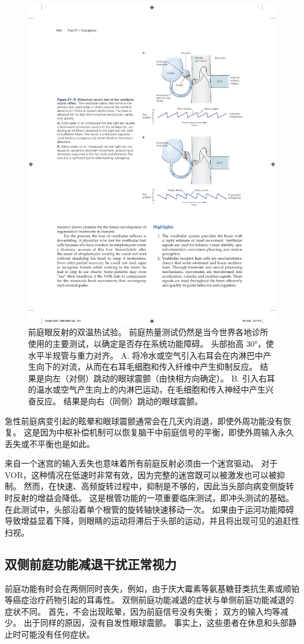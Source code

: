 \begin{figure}[htbp]
	\centering
	\includegraphics[width=0.6\linewidth]{chap27/fig_27_15}
	\caption{前庭眼反射的双温热试验。 前庭热量测试仍然是当今世界各地诊所使用的主要测试，以确定是否存在系统功能障碍。 头部抬高 30°，使水平半规管与重力对齐。 A. 将冷水或空气引入右耳会在内淋巴中产生向下的对流，从而在右耳毛细胞和传入纤维中产生抑制反应。 结果是向左（对侧）跳动的眼球震颤（由快相方向确定）。 B. 引入右耳的温水或空气产生向上的内淋巴运动，在毛细胞和传入神经中产生兴奋反应。 结果是向右（同侧）跳动的眼球震颤。}
	\label{fig:27_15}
\end{figure}


急性前庭病变引起的眩晕和眼球震颤通常会在几天内消退，即使外周功能没有恢复。
这是因为中枢补偿机制可以恢复脑干中前庭信号的平衡，即使外周输入永久丢失或不平衡也是如此。


来自一个迷宫的输入丢失也意味着所有前庭反射必须由一个迷宫驱动。
对于 VOR，这种情况在低速时非常有效，因为完整的迷宫既可以被激发也可以被抑制。
然而，在快速、高频旋转过程中，抑制是不够的，因此当头部向病变侧旋转时反射的增益会降低。
这是根管功能的一项重要临床测试，即冲头测试的基础。
在此测试中，头部沿着单个根管的旋转轴快速移动一次。
如果由于运河功能障碍导致增益显着下降，则眼睛的运动将滞后于头部的运动，并且将出现可见的追赶性扫视。



\subsection{双侧前庭功能减退干扰正常视力}

前庭功能有时会在两侧同时丧失，例如，由于庆大霉素等氨基糖苷类抗生素或顺铂等癌症治疗药物引起的耳毒性。
双侧前庭功能减退的症状与单侧前庭功能减退的症状不同。
首先，不会出现眩晕，因为前庭信号没有失衡；
双方的输入均等减少。
出于同样的原因，没有自发性眼球震颤。
事实上，这些患者在休息和头部静止时可能没有任何症状。


